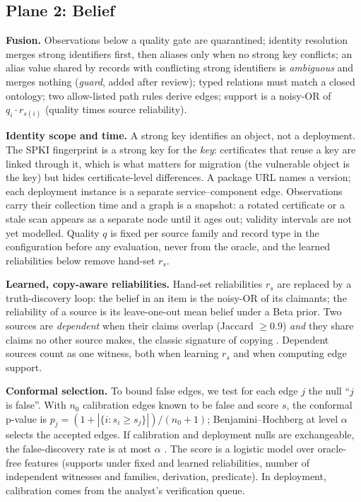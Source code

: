 \documentclass[a4paper,twoside]{article}
\begin{document}
\subsection{Plane 2: Belief}
\textbf{Fusion.} Observations below a quality gate are quarantined; identity resolution merges strong identifiers first, then aliases only when no strong key conflicts; an alias value shared by records with conflicting strong identifiers is \emph{ambiguous} and merges nothing (\emph{guard}, added after review); typed relations must match a closed ontology; two allow-listed path rules derive edges; support is a noisy-OR of $q_i \cdot r_{s(i)}$ (quality times source reliability).

\textbf{Identity scope and time.} A strong key identifies an object, not a deployment. The SPKI fingerprint is a strong key for the \emph{key}: certificates that reuse a key are linked through it, which is what matters for migration (the vulnerable object is the key) but hides certificate-level differences. A package URL names a version; each deployment instance is a separate service--component edge. Observations carry their collection time and a graph is a snapshot: a rotated certificate or a stale scan appears as a separate node until it ages out; validity intervals are not yet modelled. Quality $q$ is fixed per source family and record type in the configuration before any evaluation, never from the oracle, and the learned reliabilities below remove hand-set $r_s$.

\textbf{Learned, copy-aware reliabilities.} Hand-set reliabilities $r_s$ are replaced by a truth-discovery loop: the belief in an item is the noisy-OR of its claimants; the reliability of a source is its leave-one-out mean belief under a Beta prior. Two sources are \emph{dependent} when their claims overlap (Jaccard $\ge 0.9$) \emph{and} they share claims no other source makes, the classic signature of copying \cite{wang2026depenbaye}. Dependent sources count as one witness, both when learning $r_s$ and when computing edge support.

\textbf{Conformal selection.} To bound false edges, we test for each edge $j$ the null ``$j$ is false''. With $n_0$ calibration edges known to be false and score $s$, the conformal p-value is $p_j = (1+|\{i: s_i \ge s_j\}|)/(n_0+1)$; Benjamini--Hochberg \cite{benjamini1995fdr} at level $\alpha$ selects the accepted edges. If calibration and deployment nulls are exchangeable, the false-discovery rate is at most $\alpha$ \cite{bates2023conformal}. The score is a logistic model over oracle-free features (supports under fixed and learned reliabilities, number of independent witnesses and families, derivation, predicate). In deployment, calibration comes from the analyst's verification queue.
\end{document}
